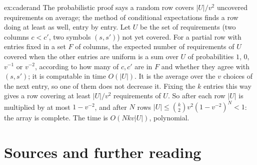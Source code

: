 \begin{solution}{ex:caderand}
\idea The probabilistic proof says a random row covers $|U|/v^2$ uncovered requirements on average; the method of conditional expectations finds a row doing at least as well, entry by entry.
\writeup Let $U$ be the set of requirements (two columns $c<c'$, two symbols $(s,s')$) not yet covered. For a partial row with entries fixed in a set $F$ of columns, the expected number of requirements of $U$ covered when
the other entries are uniform is a sum over $U$ of probabilities $1$, $0$, $v^{-1}$ or $v^{-2}$, according to how many of $c,c'$ are in $F$ and whether they agree with $(s,s')$; it is computable in time
$O(|U|)$. It is the average over the $v$ choices of the next entry, so one of them does not decrease it. Fixing the $k$ entries this way gives a row covering at least $|U|/v^2$ requirements of $U$. So
after each row $|U|$ is multiplied by at most $1-v^{-2}$, and after $N$ rows $|U|\le\binom k2v^2(1-v^{-2})^N<1$: the array is complete. The time is $O(Nkv|U|)$, polynomial.
\end{solution}

\section*{Sources and further reading}

